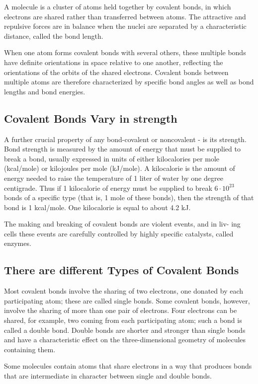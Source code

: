 A molecule is a cluster of atoms held together by covalent bonds, in which
electrons are shared rather than transferred between atoms.
The attractive and repulsive forces are in balance when the nuclei are separated 
by a characteristic distance, called the bond length.

When one atom forms covalent bonds with several others, these multiple
bonds have definite orientations in space relative to one another, reflecting 
the orientations of the orbits of the shared electrons. Covalent bonds
between multiple atoms are therefore characterized by specific bond
angles as well as bond lengths and bond energies.

\subsection{Covalent Bonds Vary in strength}

A further crucial property of any bond-covalent or noncovalent - is its strength. Bond
strength is measured by the amount of energy that must be supplied to
break a bond, usually expressed in units of either kilocalories per mole
(kcal/mole) or kilojoules per mole (kJ/mole). A kilocalorie is the amount
of energy needed to raise the temperature of 1 liter of water by one degree centigrade. Thus
if 1 kilocalorie of energy must be supplied to break $6 \cdot 10^{23}$ bonds of a
specific type (that is, 1 mole of these bonds), then the strength of that
bond is 1 kcal/mole. One kilocalorie is equal to about 4.2 kJ.

The making and breaking of covalent bonds are violent events, and in liv-
ing cells these events are carefully controlled by highly specific catalysts,
called enzymes.

\subsection{There are different Types of Covalent Bonds}

Most covalent bonds involve the sharing of two electrons, one donated
by each participating atom; these are called single bonds. Some covalent
bonds, however, involve the sharing of more than one pair of electrons.
Four electrons can be shared, for example, two coming from each participating 
atom; such a bond is called a double bond. Double bonds are
shorter and stronger than single bonds and have a characteristic effect
on the three-dimensional geometry of molecules containing them.

Some molecules contain atoms that share electrons in a way that produces 
bonds that are intermediate in character between single and double
bonds.

